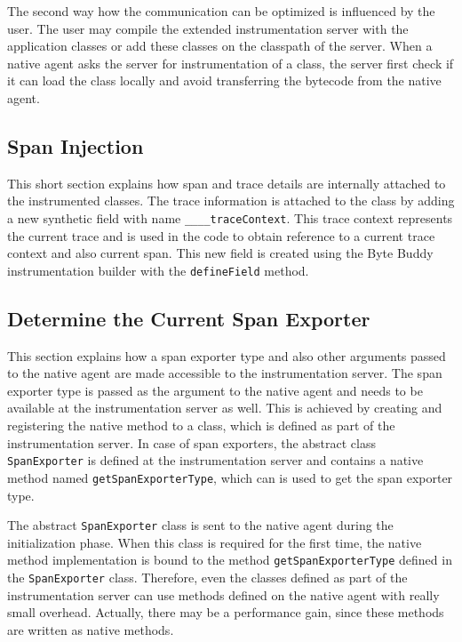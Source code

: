 The second way how the communication can be optimized is influenced by the user. The user may compile the extended instrumentation server with the application classes or add these classes on the classpath of the server. When a native agent asks the server for instrumentation of a class, the server first check if it can load the class locally and avoid transferring the bytecode from the native agent. 


\subsection{Span Injection}
This short section explains how span and trace details are internally attached to the instrumented classes. The trace information is attached to the class by adding a new synthetic field with name \texttt{\_\_\_\_traceContext}. This trace context represents the current trace and is used in the code to obtain reference to a current trace context and also current span. This new field is created using the Byte Buddy instrumentation builder with the \texttt{defineField} method.


\subsection{Determine the Current Span Exporter}
This section explains how a span exporter type and also other arguments passed to the native agent are made accessible to the instrumentation server. The span exporter type is passed as the argument to the native agent and needs to be available at the instrumentation server as well. This is achieved by creating and registering the native method to a class, which is defined as part of the instrumentation server. In case of span exporters, the abstract class \texttt{SpanExporter} is defined at the instrumentation server and contains a native method named \texttt{getSpanExporterType}, which can is used to get the span exporter type.

 The abstract \linebreak \texttt{SpanExporter} class is sent to the native agent during the initialization phase. When this class is required for the first time, the native method implementation is bound to the method \texttt{getSpanExporterType} defined in the \texttt{SpanExporter} class. Therefore, even the classes defined as part of the instrumentation server can use methods defined on the native agent with really small overhead. Actually, there may be a performance gain, since these methods are written as native methods.



